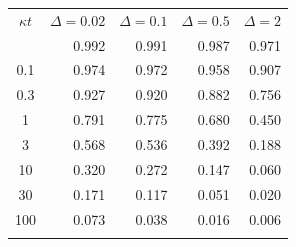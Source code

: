 \begin{tabular}{@{}crrrr@{}}
\toprule
$\kappa t$ & $\Delta=0.02$ & $\Delta=0.1$ & $\Delta=0.5$ & $\Delta=2$ \\
\colrule
0.03 & 0.992 & 0.991 & 0.987 & 0.971 \\
0.1 & 0.974 & 0.972 & 0.958 & 0.907 \\
0.3 & 0.927 & 0.920 & 0.882 & 0.756 \\
1 & 0.791 & 0.775 & 0.680 & 0.450 \\
3 & 0.568 & 0.536 & 0.392 & 0.188 \\
10 & 0.320 & 0.272 & 0.147 & 0.060 \\
30 & 0.171 & 0.117 & 0.051 & 0.020 \\
100 & 0.073 & 0.038 & 0.016 & 0.006 \\
\botrule
\end{tabular}
